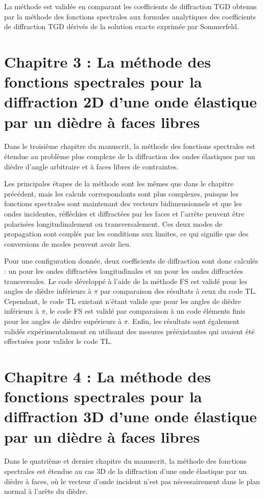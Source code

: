 La méthode est validée en comparant les coefficients de diffraction TGD obtenus par la méthode des fonctions spectrales aux formules analytiques des coefficients de diffraction TGD dérivés de la solution exacte exprimée par Sommerfeld.

\section[Résumé du chapitre 3]{Chapitre 3 : La méthode des fonctions spectrales pour la diffraction 2D d'une onde élastique par un dièdre à faces libres}

Dans le troisième chapitre du manuscrit, la méthode des fonctions spectrales est étendue au problème plus complexe de la diffraction des ondes élastiques par un dièdre d'angle arbitraire et à faces libres de contraintes.

Les principales étapes de la méthode sont les mêmes que dans le chapitre précédent, mais les calculs correspondants sont plus complexes, puisque les fonctions spectrales sont maintenant des vecteurs bidimensionnels et que les ondes incidentes, réfléchies et diffractées par les faces et l'arrête peuvent être polarisées longitudinalement ou transversalement. Ces deux modes de propagation sont couplés par les conditions aux limites, ce qui signifie que des conversions de modes peuvent avoir lieu. 

Pour une configuration donnée, deux coefficients de diffraction sont donc calculés : un pour les ondes diffractées longitudinales et un pour les ondes diffractées transversales. Le code développé à l'aide de la méthode FS est validé pour les angles de dièdre inférieurs à $\pi$ par comparaison des résultats à ceux du code TL. Cependant, le code TL existant n'étant valide que pour les angles de dièdre inférieurs à $\pi$, le code FS est validé par comparaison à un code éléments finis pour les angles de dièdre supérieurs à $\pi$. Enfin, les résultats sont également validés expérimentalement en utilisant des mesures prééxistantes qui avaient été effectuées pour valider le code TL.

\section[Résumé du chapitre 4]{Chapitre 4 : La méthode des fonctions spectrales pour la diffraction 3D d'une onde élastique par un dièdre à faces libres}

Dans le quatrième et dernier chapitre du manuscrit, la méthode des fonctions spectrales est étendue au cas 3D de la diffraction d'une onde élastique par un dièdre à faces, où le vecteur d'onde incident n'est pas nécessairement dans le plan normal à l'arête du dièdre. 

